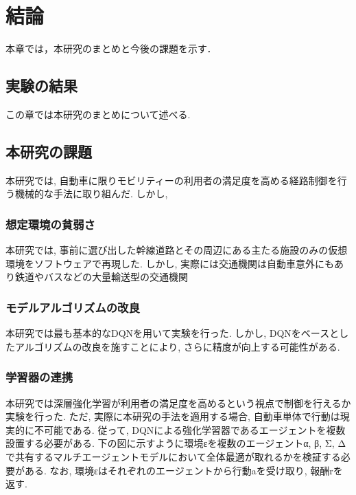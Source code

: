 \chapter{結論}
\label{conclusion}

本章では，本研究のまとめと今後の課題を示す．

\section{実験の結果}

この章では本研究のまとめについて述べる.

\section{本研究の課題}

本研究では, 自動車に限りモビリティーの利用者の満足度を高める経路制御を行う機械的な手法に取り組んだ.
しかし,

\subsection{想定環境の貧弱さ}

本研究では, 事前に選び出した幹線道路とその周辺にある主たる施設のみの仮想環境をソフトウェアで再現した. 
しかし, 実際には交通機関は自動車意外にもあり鉄道やバスなどの大量輸送型の交通機関

\subsection{モデルアルゴリズムの改良}

本研究では最も基本的なDQNを用いて実験を行った. しかし, DQNをベースとしたアルゴリズムの改良を施すことにより, さらに精度が向上する可能性がある.

\subsection{学習器の連携}

本研究では深層強化学習が利用者の満足度を高めるという視点で制御を行えるか実験を行った.
ただ, 実際に本研究の手法を適用する場合, 自動車単体で行動は現実的に不可能である.
従って, DQNによる強化学習器であるエージェントを複数設置する必要がある. 下の図に示すように環境εを複数のエージェントα, β, Σ, Δで共有するマルチエージェントモデルにおいて全体最適が取れるかを検証する必要がある.
なお, 環境εはそれぞれのエージェントから行動aを受け取り, 報酬rを返す.



